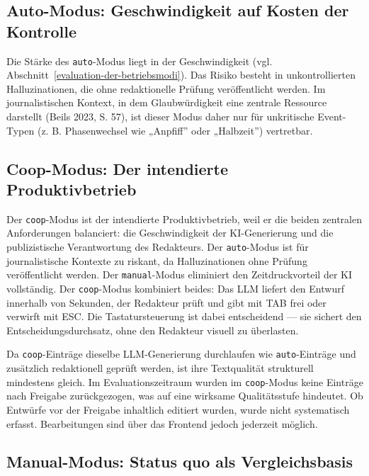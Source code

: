 \subsection{Auto-Modus: Geschwindigkeit auf Kosten der
Kontrolle}\label{auto-modus-geschwindigkeit-auf-kosten-der-kontrolle}

Die Stärke des \texttt{auto}-Modus liegt in der Geschwindigkeit (vgl.
Abschnitt~\ref{evaluation-der-betriebsmodi}). Das Risiko besteht in unkontrollierten
Halluzinationen, die ohne redaktionelle Prüfung veröffentlicht werden.
Im journalistischen Kontext, in dem Glaubwürdigkeit eine zentrale
Ressource darstellt (Beils 2023, S. 57), ist dieser Modus daher nur für
unkritische Event-Typen (z. B. Phasenwechsel wie „Anpfiff'' oder
„Halbzeit'') vertretbar.

\subsection{Coop-Modus: Der intendierte
Produktivbetrieb}\label{coop-modus-der-intendierte-produktivbetrieb}

Der \texttt{coop}-Modus ist der intendierte Produktivbetrieb, weil er
die beiden zentralen Anforderungen balanciert: die Geschwindigkeit der
KI-Generierung und die publizistische Verantwortung des Redakteurs.
Der \texttt{auto}-Modus ist für journalistische Kontexte zu riskant, da
Halluzinationen ohne Prüfung veröffentlicht werden. Der
\texttt{manual}-Modus eliminiert den Zeitdruckvorteil der KI vollständig.
Der \texttt{coop}-Modus kombiniert beides: Das LLM liefert den Entwurf
innerhalb von Sekunden, der Redakteur prüft und gibt mit TAB frei oder
verwirft mit ESC. Die Tastatursteuerung ist dabei entscheidend --- sie
sichert den Entscheidungsdurchsatz, ohne den Redakteur visuell zu
überlasten.

Da \texttt{coop}-Einträge dieselbe LLM-Generierung durchlaufen wie
\texttt{auto}-Einträge und zusätzlich redaktionell geprüft werden, ist
ihre Textqualität strukturell mindestens gleich. Im Evaluationszeitraum
wurden im \texttt{coop}-Modus keine Einträge nach Freigabe
zurückgezogen, was auf eine wirksame Qualitätsstufe hindeutet. Ob
Entwürfe vor der Freigabe inhaltlich editiert wurden, wurde nicht
systematisch erfasst. Bearbeitungen sind über das Frontend jedoch
jederzeit möglich.

\subsection{Manual-Modus: Status quo als
Vergleichsbasis}\label{manual-modus-status-quo-als-vergleichsbasis}

